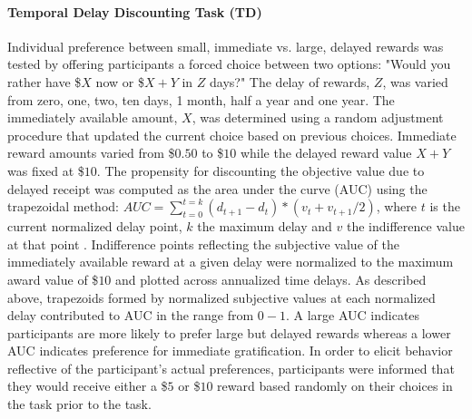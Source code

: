 \documentclass{article}%
\begin{document}
\paragraph*{Temporal Delay Discounting Task (TD)} Individual preference between small, immediate vs. large, delayed rewards was tested by offering participants a forced choice between two options: "Would you rather have \$$X$ now or \$$X+Y$ in $Z$ days?" The delay of rewards, $Z$, was varied from zero, one, two, ten days, 1 month, half a year and one year. The immediately available amount, $X$, was determined using a random adjustment procedure that updated the current choice based on previous choices. Immediate reward amounts varied from \$$0.50$ to \$$10$ while the delayed reward value $X+Y$ was fixed at \$$10$. The propensity for discounting the objective value due to delayed receipt was computed as the area under the curve (AUC) using the trapezoidal method: $AUC = \sum_{t=0}^{t=k} (d_{t+1}-d_t)*(v_t+v_{t+1} /2)$, where $t$ is the current normalized delay point, $k$ the maximum delay and $v$ the indifference value at that point \citep{Borges2016,olson2007adolescents, myerson2001area}. Indifference points reflecting the subjective value of the immediately available reward at a given delay were normalized to the maximum award value of \$$10$ and plotted across annualized time delays. As described above, trapezoids formed by normalized subjective values at each normalized delay contributed to AUC in the range from $0-1$.  A large AUC indicates participants are more likely to prefer large but delayed rewards whereas a lower AUC indicates preference for immediate gratification. In order to elicit behavior reflective of the participant's actual preferences, participants were informed that they would receive either a \$$5$ or \$$10$ reward based randomly on their choices in the task prior to the task. 
\vspace{2pt}
\end{document}
